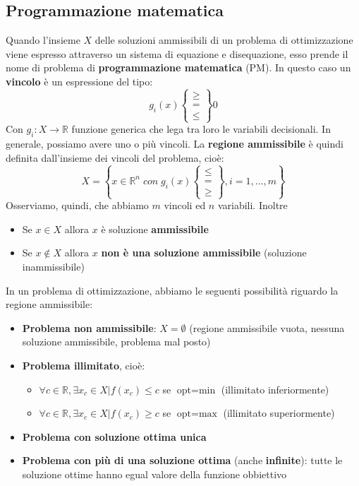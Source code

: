 \documentclass[12pt]{article}
\begin{document}
\subsection{Programmazione matematica}
Quando l'insieme $X$ delle soluzioni ammissibili di un problema di ottimizzazione viene espresso attraverso un sistema di equazione e disequazione, esso prende il nome di problema di
\textbf{programmazione matematica} (PM).
In questo caso un \textbf{vincolo} è un espressione del tipo:
$$g_i(x) \begin{Bmatrix}
    \geq \\
    = \\
    \leq
\end{Bmatrix} 0$$
Con $g_i: X \rightarrow \mathbb{R}$ funzione generica che lega tra loro le variabili decisionali.
In generale, possiamo avere uno o più vincoli. \newline
La \textbf{regione ammissibile} è quindi definita dall'insieme dei vincoli del problema, cioè:
$$X = \left \{x \in \mathbb{R}^n \; con \; g_i(x) \begin{Bmatrix} \leq \\ = \\ \geq \end{Bmatrix}, i = 1,...,m \right \}$$
Osserviamo, quindi, che abbiamo $m$ vincoli ed $n$ variabili. Inoltre
\begin{itemize}
    \item Se $x \in X$ allora $x$ è soluzione \textbf{ammissibile}
    \item Se $x \not\in X$ allora $x$ \textbf{non è una soluzione ammissibile} (soluzione inammissibile)
\end{itemize}
In un problema di ottimizzazione, abbiamo le seguenti possibilità riguardo la regione ammissibile:
\begin{itemize}
    \item \textbf{Problema non ammissibile}: $X = \emptyset$ (regione ammissibile vuota, nessuna soluzione ammissibile, problema mal posto)
    \item \textbf{Problema illimitato}, cioè:
    \begin{itemize}
        \item $\forall c \in \mathbb{R}, \exists x_c \in X | f(x_c) \leq c$ se $\textrm{opt} = \textrm{min}$ (illimitato inferiormente)
        \item $\forall c \in \mathbb{R}, \exists x_c \in X | f(x_c) \geq c$ se $\textrm{opt} = \textrm{max}$ (illimitato superiormente)
    \end{itemize}
    \item \textbf{Problema con soluzione ottima unica}
    \item \textbf{Problema con più di una soluzione ottima} (anche \textbf{infinite}): tutte le soluzione ottime hanno egual valore della funzione obbiettivo
\end{itemize}
\end{document}
